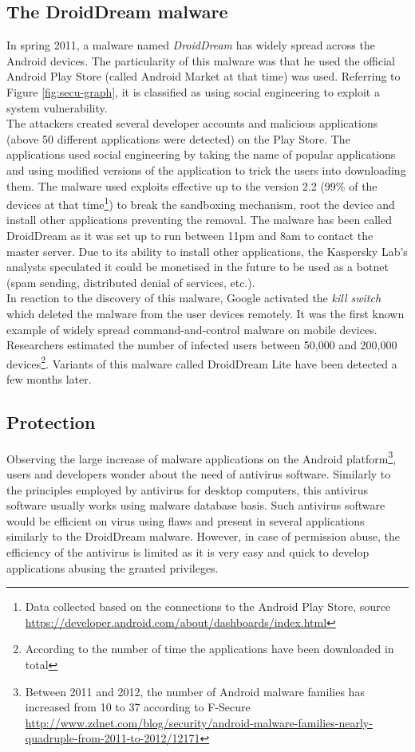 \subsection{The DroidDream malware}

In spring 2011, a malware named \emph{DroidDream} has widely spread across the Android devices.
The particularity of this malware was that he used the official Android Play Store (called Android Market at that time) was used.
Referring to Figure \ref{fig:secu-graph}, it is classified as using social engineering to exploit a system vulnerability.\\

The attackers created several developer accounts and malicious applications (above 50 different applications were detected) on the Play Store.
The applications used social engineering by taking the name of popular applications and using modified versions of the application to trick the users into downloading them.
The malware used exploits effective up to the version 2.2 (99\% of the devices at that time\footnote{Data collected based on the connections to the Android Play Store, source \url{https://developer.android.com/about/dashboards/index.html}}) to break the sandboxing mechanism, root the device and install other applications preventing the removal.
The malware has been called DroidDream as it was set up to run between 11pm and 8am to contact the master server.
Due to its ability to install other applications, the Kaspersky Lab's analysts speculated it could be monetised in the future to be used as a botnet (spam sending, distributed denial of services, etc.).\\

In reaction to the discovery of this malware, Google activated the \emph{kill switch} which deleted the malware from the user devices remotely.
It was the first known example of widely spread command-and-control malware on mobile devices.
Researchers estimated the number of infected users between 50,000 and 200,000 devices\footnote{According to the number of time the applications have been downloaded in total}.
Variants of this malware called DroidDream Lite have been detected a few months later.

\subsection{Protection}
Observing the large increase of malware applications on the Android platform\footnote{Between 2011 and 2012, the number of Android malware families has increased from 10 to 37 according to F-Secure \url{http://www.zdnet.com/blog/security/android-malware-families-nearly-quadruple-from-2011-to-2012/12171}}, users and developers wonder about the need of antivirus software.
Similarly to the principles employed by antivirus for desktop computers, this antivirus software usually works using malware database basis.
Such antivirus software would be efficient on virus using flaws and present in several applications similarly to the DroidDream malware.
However, in case of permission abuse, the efficiency of the antivirus is limited as it is very easy and quick to develop applications abusing the granted privileges.\\

